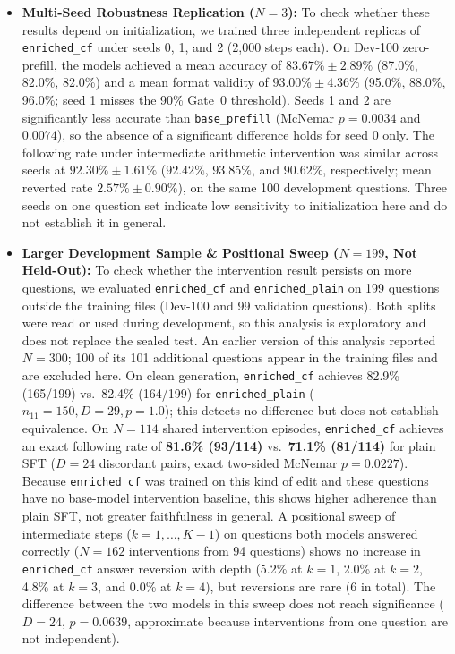 \documentclass[11pt,a4paper]{article}
\begin{document}
\begin{itemize}
    \item \textbf{Multi-Seed Robustness Replication ($N=3$):} To check whether these results depend on initialization, we trained three independent replicas of \texttt{enriched\_cf} under seeds 0, 1, and 2 (2,000 steps each). On Dev-100 zero-prefill, the models achieved a mean accuracy of $83.67\% \pm 2.89\%$ (87.0\%, 82.0\%, 82.0\%) and a mean format validity of $93.00\% \pm 4.36\%$ (95.0\%, 88.0\%, 96.0\%; seed 1 misses the 90\% Gate~0 threshold). Seeds 1 and 2 are significantly less accurate than \texttt{base\_prefill} (McNemar $p = 0.0034$ and $0.0074$), so the absence of a significant difference holds for seed 0 only. The following rate under intermediate arithmetic intervention was similar across seeds at $92.30\% \pm 1.61\%$ ($92.42\%$, $93.85\%$, and $90.62\%$, respectively; mean reverted rate $2.57\% \pm 0.90\%$), on the same 100 development questions. Three seeds on one question set indicate low sensitivity to initialization here and do not establish it in general.

    \item \textbf{Larger Development Sample \& Positional Sweep ($N=199$, Not Held-Out):} To check whether the intervention result persists on more questions, we evaluated \texttt{enriched\_cf} and \texttt{enriched\_plain} on 199 questions outside the training files (Dev-100 and 99 validation questions). Both splits were read or used during development, so this analysis is exploratory and does not replace the sealed test. An earlier version of this analysis reported $N=300$; 100 of its 101 additional questions appear in the training files and are excluded here. On clean generation, \texttt{enriched\_cf} achieves 82.9\% (165/199) vs.\ 82.4\% (164/199) for \texttt{enriched\_plain} ($n_{11}=150, D=29, p=1.0$); this detects no difference but does not establish equivalence. On $N = 114$ shared intervention episodes, \texttt{enriched\_cf} achieves an exact following rate of \textbf{81.6\% (93/114)} vs.\ \textbf{71.1\% (81/114)} for plain SFT ($D = 24$ discordant pairs, exact two-sided McNemar $p = 0.0227$). Because \texttt{enriched\_cf} was trained on this kind of edit and these questions have no base-model intervention baseline, this shows higher adherence than plain SFT, not greater faithfulness in general. A positional sweep of intermediate steps ($k = 1, \dots, K-1$) on questions both models answered correctly ($N = 162$ interventions from 94 questions) shows no increase in \texttt{enriched\_cf} answer reversion with depth (5.2\% at $k=1$, 2.0\% at $k=2$, 4.8\% at $k=3$, and 0.0\% at $k=4$), but reversions are rare (6 in total). The difference between the two models in this sweep does not reach significance ($D = 24$, $p = 0.0639$, approximate because interventions from one question are not independent).
\end{itemize}
\end{document}
